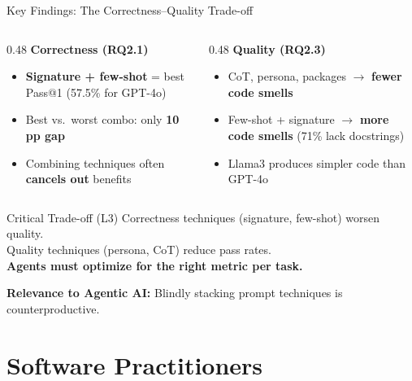 \documentclass[
11pt,notheorems,hyperref={pdfauthor=whatever}
]{beamer}
\begin{document}
\begin{frame}{Key Findings: The Correctness--Quality Trade-off}
	\begin{columns}[T]
		\begin{column}{0.48\textwidth}
			\textbf{Correctness (RQ2.1)}
			\begin{itemize}
				\item \textbf{Signature + few-shot} = best Pass@1 (57.5\% for GPT-4o)
				\item Best vs.\ worst combo: only \textbf{10 pp gap}
				\item Combining techniques often \textbf{cancels out} benefits
			\end{itemize}
		\end{column}
		\hfill
		\begin{column}{0.48\textwidth}
			\textbf{Quality (RQ2.3)}
			\begin{itemize}
				\item CoT, persona, packages $\rightarrow$ \textbf{fewer code smells}
				\item Few-shot + signature $\rightarrow$ \textbf{more code smells} (71\% lack docstrings)
				\item Llama3 produces simpler code than GPT-4o
			\end{itemize}
		\end{column}
	\end{columns}

	\vspace{0.3cm}

	\begin{block}{\centering Critical Trade-off (L3)}
		\centering
		Correctness techniques (signature, few-shot) worsen quality.\\
		Quality techniques (persona, CoT) reduce pass rates.\\
		\textbf{Agents must optimize for the right metric per task.}
	\end{block}

	\vspace{0.1cm}

	\textbf{Relevance to Agentic AI:} Blindly stacking prompt techniques is counterproductive.
\end{frame}


\section{Software Practitioners}
\end{document}
